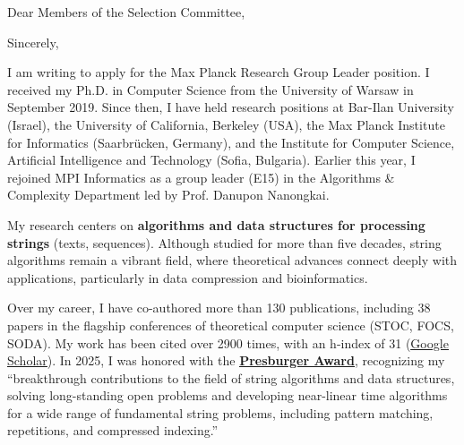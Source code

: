 \documentclass[11pt,a4paper,sans]{moderncv}
\title{\vphantom{Title}}
\begin{document}
\date{October 14th, 2025}
\opening{Dear Members of the Selection Committee,}
\subject{Application for a Max Planck Research Group: Cover Letter}
\closing{Sincerely,}
\makelettertitle

I am writing to apply for the Max Planck Research Group Leader position. I received my Ph.D. in Computer Science from the University of Warsaw in September 2019. Since then, I have held research positions at Bar-Ilan University (Israel), the University of California, Berkeley (USA), the Max Planck Institute for Informatics (Saarbrücken, Germany), and the Institute for Computer Science, Artificial Intelligence and Technology (Sofia, Bulgaria). Earlier this year, I rejoined MPI Informatics as a group leader (E15) in the Algorithms \& Complexity Department led by Prof. Danupon Nanongkai.

My research centers on \textbf{algorithms and data structures for processing strings} (texts, sequences). Although studied for more than five decades, string algorithms remain a vibrant field, where theoretical advances connect deeply with applications, particularly in data compression and bioinformatics.

Over my career, I have co-authored more than 130 publications, including 38 papers in the flagship conferences of theoretical computer science (STOC, FOCS, SODA). My work has been cited over 2900 times, with an h-index of 31 (\underline{\href{https://scholar.google.com/citations?user=mudtARsAAAAJ}{Google
 Scholar}}). In 2025, I was honored with the \underline{\href{https://eatcs.org/index.php/presburger}{\textbf{Presburger
 Award}}}, recognizing my “breakthrough contributions to the field of string algorithms and data structures, solving long-standing open problems and developing near-linear time algorithms for a wide range of fundamental string problems, including pattern matching, repetitions, and compressed indexing.”
\end{document}
